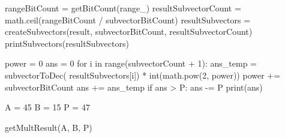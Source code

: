 \documentclass[11pt]{article}
\renewcommand\*{\cdot}
\begin{document}
\begin{python}
    rangeBitCount = getBitCount(range_)
    resultSubvectorCount = math.ceil(rangeBitCount / subvectorBitCount)
    resultSubvectors = createSubvectors(result, subvectorBitCount,
    resultSubvectorCount)
    printSubvectors(resultSubvectors)

    power = 0
    ans = 0
    for i in range(subvectorCount + 1):
    ans_temp = subvectorToDec(
    resultSubvectors[i]) * int(math.pow(2, power)) %
    power += subvectorBitCount
    ans += ans_temp
    if ans > P:
    ans -= P
    print(ans)


    A = 45
    B = 15
    P = 47

    getMultResult(A, B, P)


\end{python}
\end{document}
